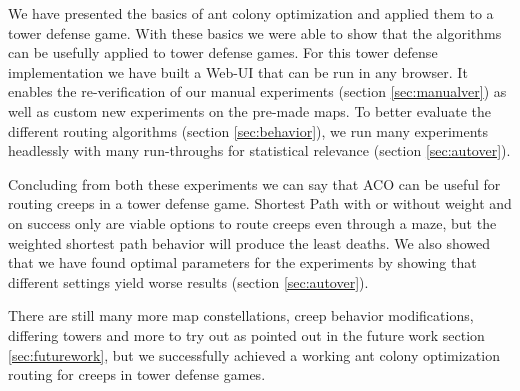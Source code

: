 We have presented the basics of ant colony optimization and applied them to a tower defense game. With these basics we were able to show that the algorithms can be usefully applied to tower defense games.
For this tower defense implementation we have built a Web-UI that can be run in any browser. It enables the re-verification of our manual experiments (section \ref{sec:manualver}) as well as custom new experiments on the pre-made maps.
To better evaluate the different routing algorithms (section \ref{sec:behavior}), we run many experiments headlessly with many run-throughs for statistical relevance (section \ref{sec:autover}).

Concluding from both these experiments we can say that ACO can be useful for routing creeps in a tower defense game. Shortest Path with or without weight and on success only are viable options to route creeps even through a maze, but the weighted shortest path behavior will produce the least deaths. We also showed that we have found optimal parameters for the experiments by showing that different settings yield worse results (section \ref{sec:autover}).

There are still many more map constellations, creep behavior modifications, differing towers and more to try out as pointed out in the future work section \ref{sec:futurework}, but we successfully achieved a working ant colony optimization routing for creeps in tower defense games.